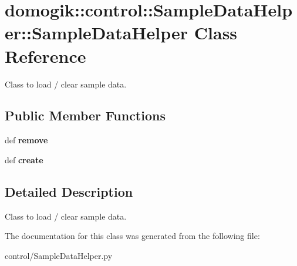 \hypertarget{classdomogik_1_1control_1_1SampleDataHelper_1_1SampleDataHelper}{
\section{domogik::control::SampleDataHelper::SampleDataHelper Class Reference}
\label{classdomogik_1_1control_1_1SampleDataHelper_1_1SampleDataHelper}
}
Class to load / clear sample data.  


\subsection*{Public Member Functions}
\begin{CompactItemize}
\item 
\hypertarget{classdomogik_1_1control_1_1SampleDataHelper_1_1SampleDataHelper_8289ab362d8b5048a413e6c5b3d3f4de}{
def \textbf{remove}}
\label{classdomogik_1_1control_1_1SampleDataHelper_1_1SampleDataHelper_8289ab362d8b5048a413e6c5b3d3f4de}

\item 
\hypertarget{classdomogik_1_1control_1_1SampleDataHelper_1_1SampleDataHelper_72168a6303032d0742cc905fa2bb3a65}{
def \textbf{create}}
\label{classdomogik_1_1control_1_1SampleDataHelper_1_1SampleDataHelper_72168a6303032d0742cc905fa2bb3a65}

\end{CompactItemize}


\subsection{Detailed Description}
Class to load / clear sample data. 

The documentation for this class was generated from the following file:\begin{CompactItemize}
\item 
control/SampleDataHelper.py\end{CompactItemize}

